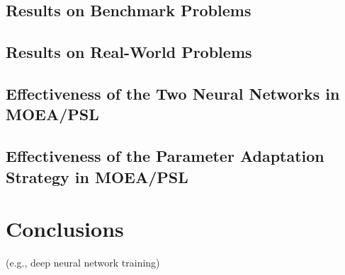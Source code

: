 \documentclass[journal]{IEEEtran}
\begin{document}
\subsection{Results on Benchmark Problems}

\subsection{Results on Real-World Problems}

\subsection{Effectiveness of the Two Neural Networks in MOEA/PSL}\label{sec:twoNNs}

\subsection{Effectiveness of the Parameter Adaptation Strategy in MOEA/PSL}

\section{Conclusions}


 (e.g., deep neural network training)

\ifCLASSOPTIONcaptionsoff
  \newpage
\fi




\end{document}
